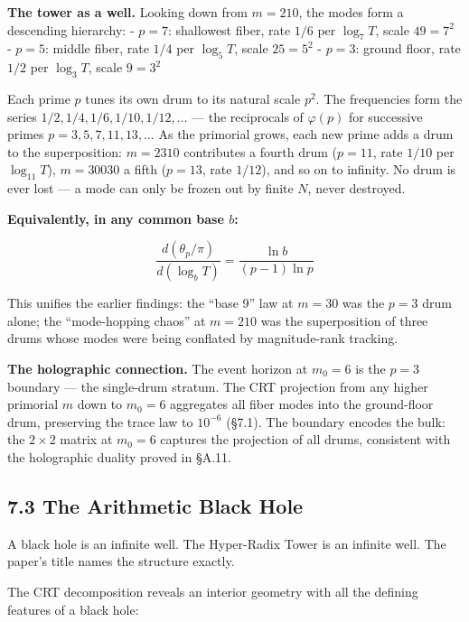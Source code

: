 \documentclass[
  11pt,
]{article}
\numberwithin{equation}{section}
\begin{document}
\textbf{The tower as a well.} Looking down from \(m = 210\), the modes
form a descending hierarchy: - \(p = 7\): shallowest fiber, rate \(1/6\)
per \(\log_7 T\), scale \(49 = 7^2\) - \(p = 5\): middle fiber, rate
\(1/4\) per \(\log_5 T\), scale \(25 = 5^2\) - \(p = 3\): ground floor,
rate \(1/2\) per \(\log_3 T\), scale \(9 = 3^2\)

Each prime \(p\) tunes its own drum to its natural scale \(p^2\). The
frequencies form the series \(1/2, 1/4, 1/6, 1/10, 1/12, \ldots\) ---
the reciprocals of \(\varphi(p)\) for successive primes
\(p = 3, 5, 7, 11, 13, \ldots\) As the primorial grows, each new prime
adds a drum to the superposition: \(m = 2310\) contributes a fourth drum
(\(p = 11\), rate \(1/10\) per \(\log_{11} T\)), \(m = 30030\) a fifth
(\(p = 13\), rate \(1/12\)), and so on to infinity. No drum is ever lost
--- a mode can only be frozen out by finite \(N\), never destroyed.

\textbf{Equivalently, in any common base \(b\):}

\begin{equation}\frac{d(\theta_p/\pi)}{d(\log_b T)} = \frac{\ln b}{(p-1) \ln p}\end{equation}

This unifies the earlier findings: the ``base 9'' law at \(m = 30\) was
the \(p = 3\) drum alone; the ``mode-hopping chaos'' at \(m = 210\) was
the superposition of three drums whose modes were being conflated by
magnitude-rank tracking.

\textbf{The holographic connection.} The event horizon at \(m_0 = 6\) is
the \(p = 3\) boundary --- the single-drum stratum. The CRT projection
from any higher primorial \(m\) down to \(m_0 = 6\) aggregates all fiber
modes into the ground-floor drum, preserving the trace law to
\(10^{-6}\) (§7.1). The boundary encodes the bulk: the \(2 \times 2\)
matrix at \(m_0 = 6\) captures the projection of all drums, consistent
with the holographic duality proved in §A.11.

\subsection{7.3 The Arithmetic Black
Hole}\label{the-arithmetic-black-hole}

A black hole is an infinite well. The Hyper-Radix Tower is an infinite
well. The paper's title names the structure exactly.

The CRT decomposition reveals an interior geometry with all the defining
features of a black hole:
\end{document}
